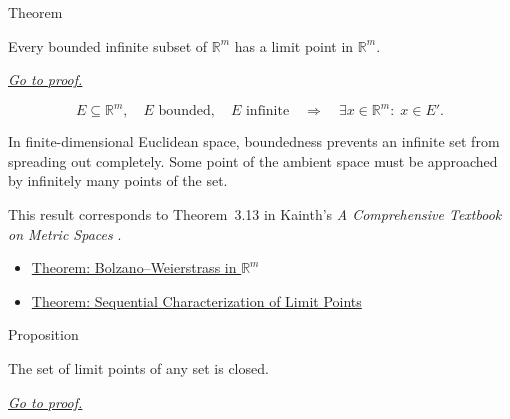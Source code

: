 \begin{theorembox}{Theorem}
\begin{theorem}
\label{thm:metric-bolzano-weierstrass-bounded-infinite-subsets}
Every bounded infinite subset of \(\mathbb{R}^m\) has a limit point in
\(\mathbb{R}^m\).

\smallskip
\noindent
\hyperref[prf:metric-bolzano-weierstrass-bounded-infinite-subsets]{\textit{Go to proof.}}
\end{theorem}
\end{theorembox}

\begin{remark*}
\[
E\subseteq\mathbb{R}^m,\quad
E\text{ bounded},\quad
E\text{ infinite}
\quad\Longrightarrow\quad
\exists x\in\mathbb{R}^m{:}\;x\in E'.
\]
\end{remark*}

\begin{remark*}[Interpretation]
In finite-dimensional Euclidean space, boundedness prevents an infinite set
from spreading out completely.  Some point of the ambient space must be
approached by infinitely many points of the set.
\end{remark*}

\begin{remark*}
This result corresponds to Theorem~3.13 in Kainth's
\emph{A Comprehensive Textbook on Metric Spaces}
\cite{KainthComprehensiveMetricSpaces2023}.
\end{remark*}

\begin{dependencies}
\begin{itemize}
  \item \hyperref[thm:metric-euclidean-bolzano-weierstrass]{Theorem: Bolzano--Weierstrass in \(\mathbb{R}^m\)}
  \item \hyperref[thm:metric-limit-point-sequential-characterization]{Theorem: Sequential Characterization of Limit Points}
\end{itemize}
\end{dependencies}

\begin{propositionbox}{Proposition}
\begin{proposition}
\label{prop:metric-derived-set-closed}
The set of limit points of any set is closed.

\smallskip
\noindent
\hyperref[prf:metric-derived-set-closed]{\textit{Go to proof.}}
\end{proposition}
\end{propositionbox}

